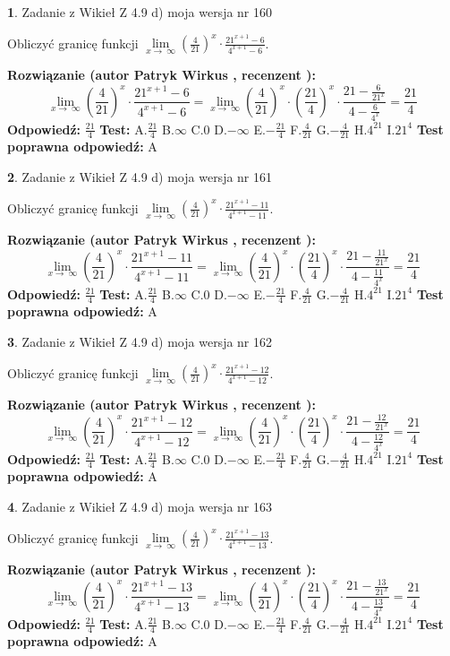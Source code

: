 \documentclass[12pt, a4paper]{article}
\theoremstyle{definition} %
\newtheorem{zad}{}
\newcommand{\zadStart}[1]{\begin{zad}#1\newline}
\newcommand{\zadStop}{\end{zad}}
\newcommand{\rozwStart}[2]{\noindent \textbf{Rozwiązanie (autor #1 , recenzent #2): }\newline}
\newcommand{\rozwStop}{\newline}
\newcommand{\odpStart}{\noindent \textbf{Odpowiedź:}\newline}
\newcommand{\odpStop}{\newline}
\newcommand{\testStart}{\noindent \textbf{Test:}\newline}
\newcommand{\testStop}{\newline}
\newcommand{\kluczStart}{\noindent \textbf{Test poprawna odpowiedź:}\newline}
\newcommand{\kluczStop}{\newline}
\begin{document}
\zadStart{Zadanie z Wikieł Z 4.9 d) moja wersja nr 160}


Obliczyć granicę funkcji  $\lim\limits_{x\to\ \infty}(\frac{4}{21})^{x}\cdot\frac{21^{x+1}-6}{4^{x+1}-6}$.
\zadStop
\rozwStart{Patryk Wirkus}{}
$$\lim\limits_{x\to\ \infty}(\frac{4}{21})^{x}\cdot\frac{21^{x+1}-6}{4^{x+1}-6}=\lim\limits_{x\to\ \infty}(\frac{4}{21})^{x}\cdot(\frac{21}{4})^{x} \cdot \frac{21-\frac{6}{21^{x}}}{4-\frac{6}{4^{x}}} = \frac{21}{4}$$
\rozwStop
\odpStart
$\frac{21}{4}$
\odpStop
\testStart
A.$\frac{21}{4}$ B.$\infty$ C.$0$ D.$-\infty$ E.$-\frac{21}{4}$
F.$\frac{4}{21}$ G.$-\frac{4}{21}$
H.$4^{21}$
I.$21^{4}$
\testStop
\kluczStart
A
\kluczStop



\zadStart{Zadanie z Wikieł Z 4.9 d) moja wersja nr 161}


Obliczyć granicę funkcji  $\lim\limits_{x\to\ \infty}(\frac{4}{21})^{x}\cdot\frac{21^{x+1}-11}{4^{x+1}-11}$.
\zadStop
\rozwStart{Patryk Wirkus}{}
$$\lim\limits_{x\to\ \infty}(\frac{4}{21})^{x}\cdot\frac{21^{x+1}-11}{4^{x+1}-11}=\lim\limits_{x\to\ \infty}(\frac{4}{21})^{x}\cdot(\frac{21}{4})^{x} \cdot \frac{21-\frac{11}{21^{x}}}{4-\frac{11}{4^{x}}} = \frac{21}{4}$$
\rozwStop
\odpStart
$\frac{21}{4}$
\odpStop
\testStart
A.$\frac{21}{4}$ B.$\infty$ C.$0$ D.$-\infty$ E.$-\frac{21}{4}$
F.$\frac{4}{21}$ G.$-\frac{4}{21}$
H.$4^{21}$
I.$21^{4}$
\testStop
\kluczStart
A
\kluczStop



\zadStart{Zadanie z Wikieł Z 4.9 d) moja wersja nr 162}


Obliczyć granicę funkcji  $\lim\limits_{x\to\ \infty}(\frac{4}{21})^{x}\cdot\frac{21^{x+1}-12}{4^{x+1}-12}$.
\zadStop
\rozwStart{Patryk Wirkus}{}
$$\lim\limits_{x\to\ \infty}(\frac{4}{21})^{x}\cdot\frac{21^{x+1}-12}{4^{x+1}-12}=\lim\limits_{x\to\ \infty}(\frac{4}{21})^{x}\cdot(\frac{21}{4})^{x} \cdot \frac{21-\frac{12}{21^{x}}}{4-\frac{12}{4^{x}}} = \frac{21}{4}$$
\rozwStop
\odpStart
$\frac{21}{4}$
\odpStop
\testStart
A.$\frac{21}{4}$ B.$\infty$ C.$0$ D.$-\infty$ E.$-\frac{21}{4}$
F.$\frac{4}{21}$ G.$-\frac{4}{21}$
H.$4^{21}$
I.$21^{4}$
\testStop
\kluczStart
A
\kluczStop



\zadStart{Zadanie z Wikieł Z 4.9 d) moja wersja nr 163}


Obliczyć granicę funkcji  $\lim\limits_{x\to\ \infty}(\frac{4}{21})^{x}\cdot\frac{21^{x+1}-13}{4^{x+1}-13}$.
\zadStop
\rozwStart{Patryk Wirkus}{}
$$\lim\limits_{x\to\ \infty}(\frac{4}{21})^{x}\cdot\frac{21^{x+1}-13}{4^{x+1}-13}=\lim\limits_{x\to\ \infty}(\frac{4}{21})^{x}\cdot(\frac{21}{4})^{x} \cdot \frac{21-\frac{13}{21^{x}}}{4-\frac{13}{4^{x}}} = \frac{21}{4}$$
\rozwStop
\odpStart
$\frac{21}{4}$
\odpStop
\testStart
A.$\frac{21}{4}$ B.$\infty$ C.$0$ D.$-\infty$ E.$-\frac{21}{4}$
F.$\frac{4}{21}$ G.$-\frac{4}{21}$
H.$4^{21}$
I.$21^{4}$
\testStop
\kluczStart
A
\kluczStop
\end{document}
